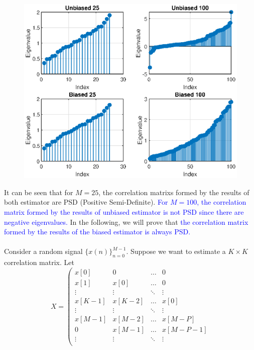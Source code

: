 \documentclass[letterpaper,12pt]{article}
\begin{document}
\begin{enumerate}
\begin{itemize}
      \begin{figure}[H]
        \centering
        \includegraphics[scale = 1.0]{Rxx.eps}
      \end{figure}
      It can be seen that for $M = 25$, the correlation matrixs formed by the results of both estimator are PSD (Positive Semi-Definite). 
      \textcolor{blue}{For $M = 100$, the correlation matrix formed by the results of unbiased estimator is not PSD since there are negative eigenvalues.}
      In the following, we will prove that \textcolor{blue}{the correlation matrix formed by the results of the biased estimator is always PSD.} \hfill \\
      \hfill \\
      Consider a random signal $\{x(n)\}_{n=0}^{M-1}$. Suppose we want to estimate a $K \times K$ correlation matrix. Let 
      \begin{equation*}
        X = \left(\begin{array}{cccc}
          x[0] & 0 & \hdots & 0 \\
          x[1] & x[0] & \hdots & 0 \\
          \vdots & \vdots & \ddots & \vdots \\
          x[K-1] & x[K-2] & \hdots & x[0] \\
          \vdots & \vdots & \ddots & \vdots \\
          x[M-1] & x[M-2] & \hdots & x[M-P] \\
          0 & x[M-1] & \hdots & x[M - P - 1] \\
          \vdots & \vdots & \ddots & \vdots \\

\end{array}
\end{equation*}
\end{itemize}
\end{enumerate}
\end{document}
